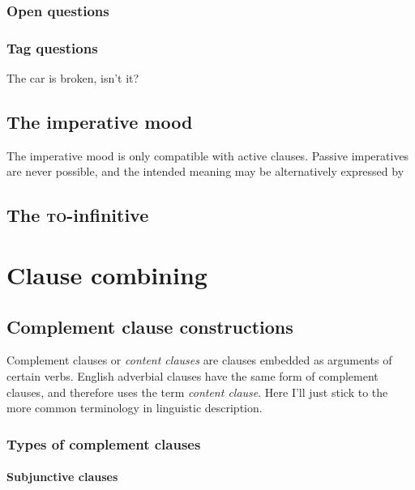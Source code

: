 \documentclass[UTF8, a4paper, oneside, scheme=plain]{ctexrep}
\newcommand*{\term}[1]{\emph{#1}}
\newcommand{\corpuscat}[1]{\textsc{#1}}
\begin{document}
\subsection{Open questions}

\subsection{Tag questions}

\begin{exe}
    \ex The car is broken, isn't it?
\end{exe}

\section{The imperative mood}

The imperative mood is only compatible with active clauses.
Passive imperatives are never possible, 
and the intended meaning may be alternatively expressed by 

\section{The \corpuscat{to}-infinitive}

\chapter{Clause combining}\label{chap:clause-combining}

\section{Complement clause constructions}\label{sec:clause-combining.complement-clause}

Complement clauses or \term{content clauses} \citep{cgel} are clauses embedded as arguments of certain verbs.
English adverbial clauses have the same form of complement clauses,
and therefore \citet{cgel} uses the term \term{content clause}.
Here I'll just stick to the more common terminology in linguistic description.

\subsection{Types of complement clauses}

\subsubsection{Subjunctive clauses}\label{sec:complement.subjunctive}
\end{document}

